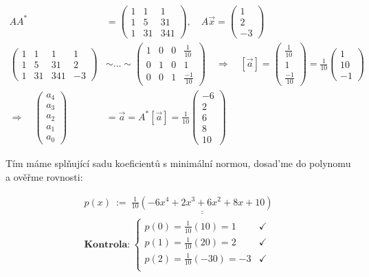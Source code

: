 \documentclass[12pt]{article}
\begin{document}
\begin{align*}
  AA^* &= \left(\begin{array}{ccc}
    1 & 1 & 1 \\
    1 & 5 & 31 \\
    1 & 31 & 341
  \end{array}\right), \quad
  A\vec{x} = \left(\begin{array}{c}
    1 \\ 2 \\ -3
  \end{array}\right) \\[2em]
  \left(\begin{array}{ccc|c}
    1 & 1 & 1 & 1 \\
    1 & 5 & 31 & 2 \\
    1 & 31 & 341 & -3
  \end{array}\right) &\sim ... \sim \left(\begin{array}{ccc|c}
    1&0&0&\frac{1}{10} \\[.5em]
    0&1&0&1 \\[.5em]
    0&0&1&\frac{-1}{10}
  \end{array}\right) \quad \Longrightarrow \quad [\vec{a}] = \left(\begin{array}{c}
    \frac{1}{10} \\[.5em] 1 \\[.5em] \frac{-1}{10}
  \end{array}\right) = \frac{1}{10}\left(\begin{array}{c}
    1\\10\\-1
  \end{array}\right) \\[2em]
  \Longrightarrow \quad
  \left(\begin{array}{c}
    a_4 \\ a_3 \\ a_2 \\ a_1 \\ a_0
  \end{array}\right) &= \vec{a} = A^*[\vec{a}] = \frac{1}{10}\left(\begin{array}{c}
    -6 \\ 2 \\ 6 \\ 8 \\ 10
  \end{array}\right)
\end{align*}

Tím máme splňující sadu koeficientů s minimální normou, dosad'me do polynomu a ověřme rovnosti:

\begin{align*}
  p(x)\ :=\ \underline{\underline{\frac{1}{10} \left(-6x^4+2x^3+6x^2+8x+10\right)}} \\[1em]
  \textbf{Kontrola:}\ \begin{cases}
    p(0) = \frac{1}{10}(10) = 1 & \checkmark \\
    p(1) = \frac{1}{10}(20) = 2 & \checkmark \\
    p(2) = \frac{1}{10}(-30) = -3 & \checkmark \\
  \end{cases}
\end{align*}
\end{document}
